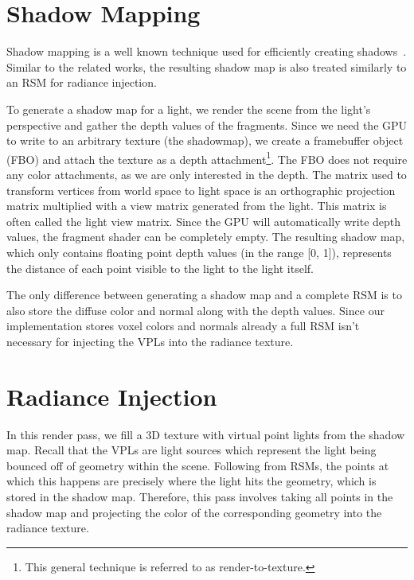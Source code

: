 
\section{Shadow Mapping}
Shadow mapping is a well known technique used for efficiently creating shadows~\cite{Williams:1978:CCS:965139.807402}. Similar to the related works, the resulting shadow map is also treated similarly to an RSM for radiance injection.

To generate a shadow map for a light, we render the scene from the light's perspective and gather the depth values of the fragments. Since we need the GPU to write to an arbitrary texture (the shadowmap), we create a framebuffer object (FBO) and attach the texture as a depth attachment\footnote{This general technique is referred to as render-to-texture.}. The FBO does not require any color attachments, as we are only interested in the depth. The matrix used to transform vertices from world space to light space is an orthographic projection matrix multiplied with a view matrix generated from the light. This matrix is often called the light view matrix. Since the GPU will automatically write depth values, the fragment shader can be completely empty. The resulting shadow map, which only contains floating point depth values (in the range [0, 1]), represents the distance of each point visible to the light to the light itself.

The only difference between generating a shadow map and a complete RSM is to also store the diffuse color and normal along with the depth values. Since our implementation stores voxel colors and normals already a full RSM isn't necessary for injecting the VPLs into the radiance texture.


\section{Radiance Injection}
In this render pass, we fill a 3D texture with virtual point lights from the shadow map. Recall that the VPLs are light sources which represent the light being bounced off of geometry within the scene. Following from RSMs, the points at which this happens are precisely where the light hits the geometry, which is stored in the shadow map. Therefore, this pass involves taking all points in the shadow map and projecting the color of the corresponding geometry into the radiance texture.

